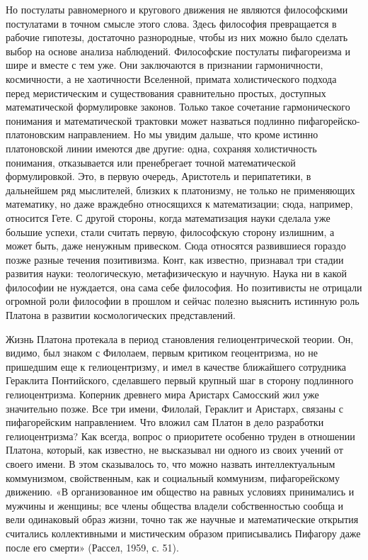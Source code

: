 Но   постулаты  равномерного   и   кругового   движения  не   являются
философскими постулатами в точном  смысле этого слова. Здесь философия
превращается в рабочие гипотезы,  достаточно разнородные, чтобы из них
можно  было сделать  выбор на  основе анализа  наблюдений. Философские
постулаты пифагореизма  и шире и вместе  с тем уже. Они  заключаются в
признании  гармоничности,  космичности,  а не  хаотичности  Вселенной,
примата  холистического подхода  перед  меристическим и  существования
сравнительно простых,  доступных математической  формулировке законов.
Только  такое  сочетание  гармонического  понимания  и  математической
трактовки    может   назваться    подлинно   пифагорейско-платоновским
направлением.  Но мы  увидим  дальше, что  кроме истинно  платоновской
линии  имеются две  другие:  одна,  сохраняя холистичность  понимания,
отказывается  или  пренебрегает точной  математической  формулировкой.
Это,  в  первую  очередь,  Аристотель  и  перипатетики,  в  дальнейшем
ряд  мыслителей,  близких  к  платонизму,  не  только  не  применяющих
математику,  но  даже  враждебно относящихся  к  математизации;  сюда,
например,  относится  Гете.  С  другой  стороны,  когда  математизация
науки сделала  уже большие  успехи, стали считать  первую, философскую
сторону  излишним,  а  может   быть,  даже  ненужным  привеском.  Сюда
относятся развившиеся гораздо позже  разные течения позитивизма. Конт,
как  известно, признавал  три  стадии  развития науки:  теологическую,
метафизическую и  научную. Наука  ни в  какой философии  не нуждается,
она  сама себе  философия. Но  позитивисты не  отрицали огромной  роли
философии в прошлом и сейчас  полезно выяснить истинную роль Платона в
развитии космологических представлений.

Жизнь Платона протекала в период становления гелиоцентрической теории.
Он, видимо,  был знаком с  Филолаем, первым критиком  геоцентризма, но
не  пришедшим  еще к  гелиоцентризму,  и  имел в  качестве  ближайшего
сотрудника  Гераклита Понтийского,  сделавшего  первый  крупный шаг  в
сторону  подлинного гелиоцентризма.  Коперник  древнего мира  Аристарх
Самосский жил уже значительно позже.  Все три имени, Филолай, Гераклит
и  Аристарх,  связаны с  пифагорейским  направлением.  Что вложил  сам
Платон  в  дело  разработки   гелиоцентризма?  Как  всегда,  вопрос  о
приоритете особенно труден в отношении Платона, который, как известно,
не  высказывал ни  одного  из своих  учений от  своего  имени. В  этом
сказывалось  то,  что   можно  назвать  интеллектуальным  коммунизмом,
свойственным, как и социальный  коммунизм, пифагорейскому движению. «В
организованное им общество на равных  условиях принимались и мужчины и
женщины;  все  члены общества  владели  собственностью  сообща и  вели
одинаковый образ жизни, точно так же научные и математические открытия
считались коллективными  и мистическим образом  приписывались Пифагору
даже после его смерти» (Рассел, 1959, с. 51).


